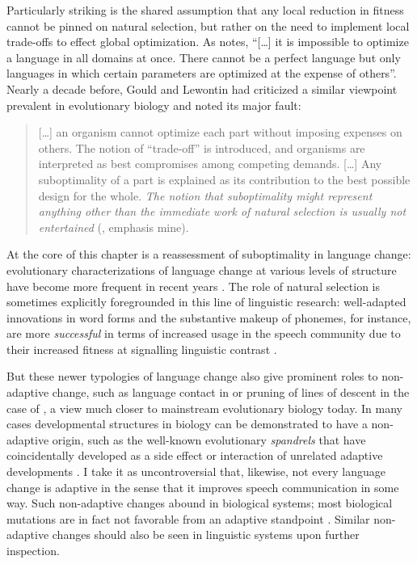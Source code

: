 \documentclass[output=paper,hidelinks]{langscibook}
\begin{document}
Particularly striking is the shared assumption that any local reduction in fitness cannot be pinned on natural selection, but rather on the need to implement local trade-offs to effect global optimization. As \citet[14]{vennemann} notes, ``[\ldots] it is impossible to optimize a language in all domains at once. There cannot be a perfect language but only languages in which certain parameters are optimized at the expense of others''. Nearly a decade before, Gould and Lewontin had criticized a similar viewpoint prevalent in evolutionary biology and noted its major fault:

\begin{quotation}
[\ldots{}] an organism cannot optimize each part without imposing expenses on others. The notion of ``trade-off'' is introduced, and organisms are interpreted as best compromises among competing demands. [\ldots{}] Any suboptimality of a part is explained as its contribution to the best possible design for the whole. \textit{The notion that suboptimality might represent anything other than the immediate work of natural selection is usually not entertained} (\citealp[585--586]{gould-lewontin}, emphasis mine).
\end{quotation}

At the core of this chapter is a reassessment of suboptimality in language change: evolutionary characterizations of language change at various levels of structure have become more frequent in recent years \citep{blevins-synopsis, croft-explaining, wedel-exemplar, mufwene}.
The role of natural selection is sometimes explicitly foregrounded in this line of linguistic research: well-adapted innovations in word forms and the substantive makeup of phonemes, for instance, are more \textit{successful} in terms of increased usage in the speech community due to their increased fitness at signalling linguistic contrast \citep[261--263]{wedel-exemplar}.

But these newer typologies of language change also give prominent roles to non-adaptive change, such as language contact in \citet{blevins-synopsis} or pruning of lines of descent in the case of \citet{wedel-exemplar}, a view much closer to mainstream evolutionary biology today. In many cases developmental structures in biology can be demonstrated to have a non-adaptive origin, such as the well-known evolutionary \textit{spandrels} that have coincidentally developed as a side effect or interaction of unrelated adaptive developments \citep{gould-lewontin, gould}.
%
I take it as uncontroversial that, likewise, not every language change is adaptive in the sense that it improves speech communication in some way. Such non-adaptive changes abound in biological systems; most biological mutations are in fact not favorable from an adaptive standpoint \citep[945--946]{orr}. Similar non-adaptive changes should also be seen in linguistic systems upon further inspection.
\end{document}
